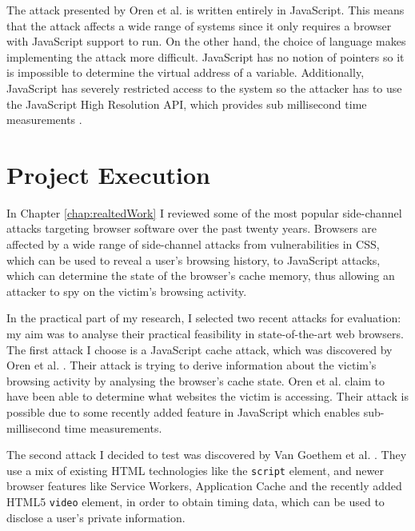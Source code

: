 \documentclass[10pt,a4paper,twoside]{book}
\begin{document}
The attack presented by Oren et al. is written entirely in JavaScript. This means that the attack affects a wide range of systems since it only requires a browser with JavaScript support to run. On the other hand, the choice of language makes implementing the attack more difficult. JavaScript has no notion of pointers so it is impossible to determine the virtual address of a variable. Additionally, JavaScript has severely restricted access to the system so the attacker has to use the JavaScript High Resolution API, which provides sub millisecond time measurements \cite{oren2015spy}.


\chapter{Project Execution}
\label{chap:execution}


In Chapter \ref{chap:realtedWork} I reviewed some of the most popular side-channel attacks targeting browser software over the past twenty years. Browsers are affected by a wide range of side-channel attacks from vulnerabilities in CSS, which can be used to reveal a user's browsing history, to JavaScript attacks, which can determine the state of the browser's cache memory, thus allowing an attacker to spy on the victim's browsing activity.

In the practical part of my research, I selected two recent attacks for evaluation: my aim was to analyse their practical feasibility in state-of-the-art web browsers. The first attack I choose is a JavaScript cache attack, which was discovered by Oren et al. \cite{oren2015spy}. Their attack is trying to derive information about the victim's browsing activity by analysing the browser's cache state. Oren et al. \cite{oren2015spy} claim to have been able to determine what websites the victim is accessing. Their attack is possible due to some recently added feature in JavaScript which enables sub-millisecond time measurements.

The second attack I decided to test was discovered by Van Goethem et al. \cite{van2015clock}. They use a mix of existing HTML technologies like the \texttt{script} element, and newer browser features like Service Workers, Application Cache and the recently added HTML5 \texttt{video} element, in order to obtain timing data, which can be used to disclose a user's private information.
\end{document}
